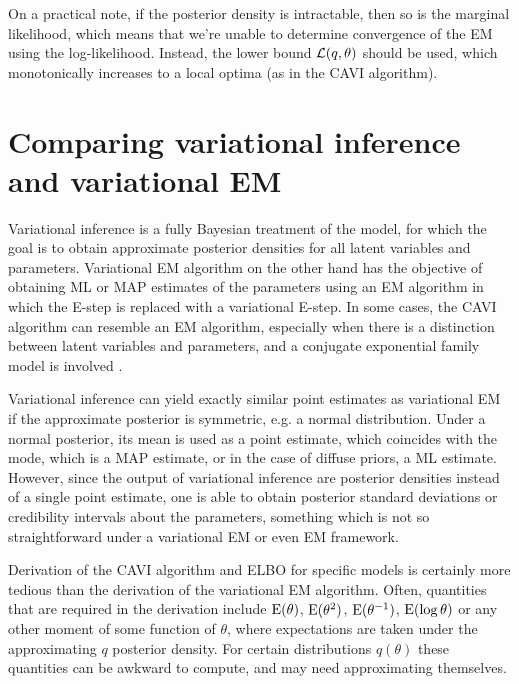 On a practical note, if the posterior density is intractable, then so is the marginal likelihood, which means that we're unable to determine convergence of the EM using the log-likelihood.
Instead, the lower bound ${\mathcal L}(q,\theta)$ should be used, which monotonically increases to a local optima (as in the CAVI algorithm).

\section{Comparing variational inference and variational EM}

Variational inference is a fully Bayesian treatment of the model, for which the goal is to obtain approximate posterior densities for all latent variables and parameters.
Variational EM algorithm on the other hand has the objective of obtaining ML or MAP estimates of the parameters using an EM algorithm in which the E-step is replaced with a variational E-step.
In some cases, the CAVI algorithm can resemble an EM algorithm, especially when there is a distinction between latent variables and parameters, and a conjugate exponential family model is involved \citep{blei2017variational}.

Variational inference can yield exactly similar point estimates as variational EM if the approximate posterior is symmetric, e.g. a normal distribution.
Under a normal posterior, its mean is used as a point estimate, which coincides with the mode, which is a MAP estimate, or in the case of diffuse priors, a ML estimate.
However, since the output of variational inference are posterior densities instead of a single point estimate, one is able to obtain posterior standard deviations or credibility intervals about the parameters, something which is not so straightforward under a variational EM or even EM framework.

Derivation of the CAVI algorithm and ELBO for specific models is certainly more tedious than the derivation of the variational EM algorithm.
Often, quantities that are required in the derivation include $\operatorname{E}(\theta)$, $\operatorname{E}(\theta^2)$, $\operatorname{E}(\theta^{-1})$, $\operatorname{E}(\log \theta)$ or any other moment of some function of $\theta$, where expectations are taken under the approximating $q$ posterior density.
For certain distributions $q(\theta)$ these quantities can be awkward to compute, and may need approximating themselves.

